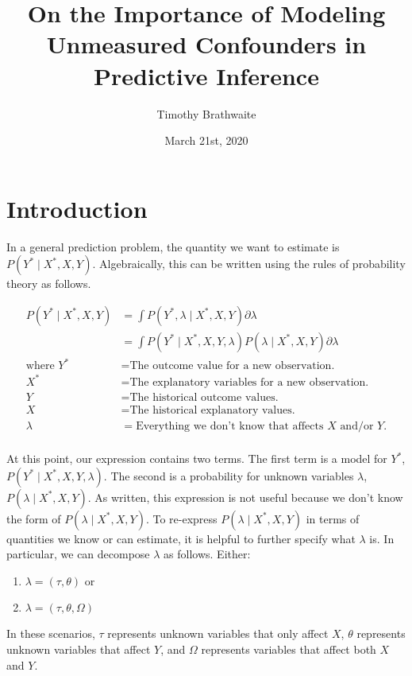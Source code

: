 \documentclass{article}
\title{On the Importance of Modeling\\Unmeasured Confounders in Predictive Inference}
\author{Timothy Brathwaite}
\date{March 21st, 2020}
\begin{document}
\maketitle

\section{Introduction}
\label{sec:intro}
In a general prediction problem, the quantity we want to estimate is $P \left( Y^{*} \mid X^{*}, X, Y \right)$. Algebraically, this can be written using the rules of probability theory as follows.

\begin{equation}
\label{eq:general-prediction}
\begin{aligned}
P \left( Y^{*} \mid X^{*}, X, Y \right) &= \int P \left( Y^{*}, \lambda \mid X^{*}, X, Y \right) \partial \lambda\\
&= \int P \left( Y^{*} \mid X^{*}, X, Y, \lambda \right) P \left( \lambda \mid X^{*}, X, Y \right) \partial \lambda\\
\textrm{where } Y^{*} &= \textrm{The outcome value for a new observation.}\\
X^{*} &= \textrm{The explanatory variables for a new observation.}\\
Y &= \textrm{The historical outcome values.}\\
X &= \textrm{The historical explanatory values.}\\
\lambda &= \textrm{Everything we don't know that affects $X$ and/or $Y$.}\\
\end{aligned}
\end{equation}

At this point, our expression contains two terms. The first term is a model for $Y^{*}$, $P \left( Y^{*} \mid X^{*}, X, Y, \lambda \right)$. The second is a probability for unknown variables $\lambda$, $P \left( \lambda \mid X^{*}, X, Y \right)$. As written, this expression is not useful because we don't know the form of $P \left( \lambda \mid X^{*}, X, Y \right)$. To re-express $P \left( \lambda \mid X^{*}, X, Y \right)$ in terms of quantities we know or can estimate, it is helpful to further specify what $\lambda$ is. In particular, we can decompose $\lambda$ as follows. Either:
\begin{enumerate}
    \item $\lambda = \left( \tau, \theta \right)$ or
    \item $\lambda = \left( \tau, \theta, \Omega \right)$
\end{enumerate}
In these scenarios, $\tau$ represents unknown variables that only affect $X$, $\theta$ represents unknown variables that affect $Y$, and $\Omega$ represents variables that affect both $X$ and $Y$.
\end{document}
